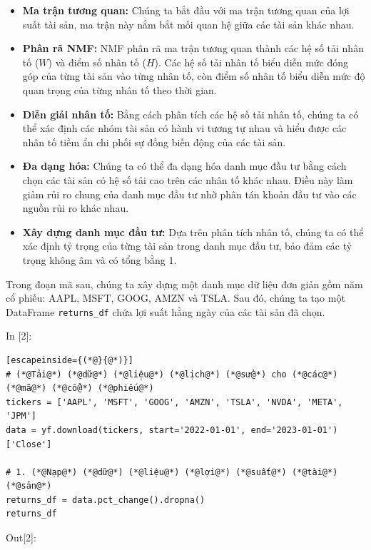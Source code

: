 \begin{itemize}
\item
  \textbf{Ma trận tương quan:} Chúng ta bắt đầu với ma trận tương quan của lợi suất tài sản, ma trận này nắm bắt mối quan hệ giữa các tài sản khác nhau.
\item
  \textbf{Phân rã NMF:} NMF phân rã ma trận tương quan thành các hệ số tải nhân tố (\(W\)) và điểm số nhân tố (\(H\)). Các hệ số tải nhân tố biểu diễn mức đóng góp của từng tài sản vào từng nhân tố, còn điểm số nhân tố biểu diễn mức độ quan trọng của từng nhân tố theo thời gian.
\item
  \textbf{Diễn giải nhân tố:} Bằng cách phân tích các hệ số tải nhân tố, chúng ta có thể xác định các nhóm tài sản có hành vi tương tự nhau và hiểu được các nhân tố tiềm ẩn chi phối sự đồng biến động của các tài sản.
\item
  \textbf{Đa dạng hóa:} Chúng ta có thể đa dạng hóa danh mục đầu tư bằng cách chọn các tài sản có hệ số tải cao trên các nhân tố khác nhau. Điều này làm giảm rủi ro chung của danh mục đầu tư nhờ phân tán khoản đầu tư vào các nguồn rủi ro khác nhau.
\item
  \textbf{Xây dựng danh mục đầu tư:} Dựa trên phân tích nhân tố, chúng ta có thể xác định tỷ trọng của từng tài sản trong danh mục đầu tư, bảo đảm các tỷ trọng không âm và có tổng bằng 1.
\end{itemize}

Trong đoạn mã sau, chúng ta xây dựng một danh mục dữ liệu đơn giản gồm năm cổ phiếu: AAPL, MSFT, GOOG, AMZN và TSLA. Sau đó, chúng ta tạo một DataFrame \texttt{returns\_df} chứa lợi suất hằng ngày của các tài sản đã chọn.

In {[}2{]}:

\begin{lstlisting}[escapeinside={(*@}{@*)}]
# (*@Tải@*) (*@dữ@*) (*@liệu@*) (*@lịch@*) (*@sử@*) cho (*@các@*) (*@mã@*) (*@cổ@*) (*@phiếu@*)
tickers = ['AAPL', 'MSFT', 'GOOG', 'AMZN', 'TSLA', 'NVDA', 'META', 'JPM']
data = yf.download(tickers, start='2022-01-01', end='2023-01-01')['Close']

# 1. (*@Nạp@*) (*@dữ@*) (*@liệu@*) (*@lợi@*) (*@suất@*) (*@tài@*) (*@sản@*)
returns_df = data.pct_change().dropna()
returns_df
\end{lstlisting}

Out{[}2{]}:

